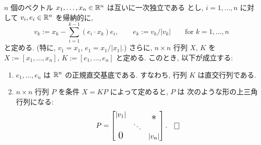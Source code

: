 \documentclass[12pt,twoside]{jarticle}
\begin{document}
\begin{question}\label{q:Schmidt}
  $n$ 個のベクトル $x_1, \dots, x_n \in {\mathbb R}^n$ は互いに一次独立である
  とし, $i = 1, \dots, n$ に対して $v_i, e_i \in{\mathbb R}^n$ を帰納的に,
  \[
    v_k := x_k - \sum_{i=1}^{k-1} (e_i \cdot x_k) e_i,
    \qquad
    e_k := v_k / |v_k|
    \qquad \text{for $k=1,\ldots,n$}
  \]
  と定める. (特に, $v_1 = x_1$, $e_1 = x_1 / |x_1|$.) %
  さらに, $n \times n$ 行列 $X$, $K$ を %
  $X := [ x_1, \ldots, x_n ]$, %
  $K := [ e_1, \ldots, e_n ]$ %
  と定める. このとき, 以下が成立する:
  \begin{enumerate}
  \item $e_1, \dots, e_n$ は ${\mathbb R}^n$ の正規直交基底である. %
    すなわち, 行列 $K$ は直交行列である.
  \item $n \times n$ 行列 $P$ を条件 $X = KP$ によって定めると, $P$ は
    次のような形の上三角行列になる:
    \[
      P =
      \begin{bmatrix}
        |v_1|         &        & \smash{\lower 1ex \hbox{\Large $\ast$}} \\
                      & \ddots & \\
        \smash{\hbox{\Large $0$}} & & |v_n| \\
      \end{bmatrix}.
      \qed
    \]
  \end{enumerate}
\end{question}
\end{document}
